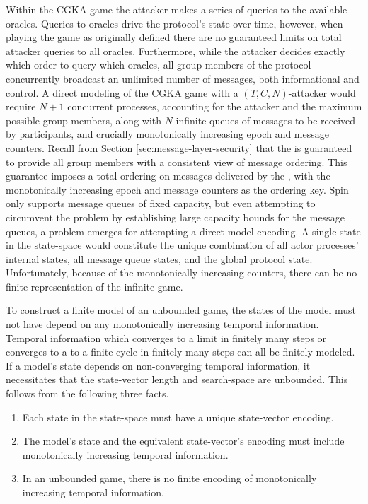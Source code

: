 Within the CGKA game the attacker makes a series of queries to the available oracles.
Queries to oracles drive the  protocol's state over time, however, when playing the game as originally defined there are no guaranteed limits on total attacker queries to all oracles.
Furthermore, while the attacker decides exactly which order to query which oracles, all group members of the  protocol concurrently broadcast an unlimited number of messages, both informational and control.
A direct modeling of the CGKA game with a \((T, C, N)\)-attacker would require \(N+1\) concurrent processes, accounting for the attacker and the maximum possible group members, along with \(N\) infinite queues of messages to be received by participants, and crucially monotonically increasing epoch and message counters.
Recall from Section \ref{sec:message-layer-security} that the  is guaranteed to provide all group members with a consistent view of message ordering.
This guarantee imposes a total ordering on messages delivered by the , with the monotonically increasing epoch and message counters as the ordering key.
Spin only supports message queues of fixed capacity, but even attempting to circumvent the problem by establishing large capacity bounds for the message queues, a problem emerges for attempting a direct model encoding.
A single state in the state-space would constitute the unique combination of all actor processes' internal states, all message queue states, and the global protocol state.
Unfortunately, because of the monotonically increasing counters, there can be no finite representation of the infinite game.

To construct a finite model of an unbounded game, the states of the model must not have depend on any monotonically increasing temporal information.
Temporal information which converges to a limit in finitely many steps or converges to a to a finite cycle in finitely many steps can all be finitely modeled.
If a model's state depends on non-converging temporal information, it necessitates that the state-vector length and search-space are unbounded.
This follows from the following three facts.

\begin{enumerate}
\def\labelenumi{\arabic{enumi}.}
\item Each state in the state-space must have a unique state-vector encoding.
\item The model's state and the equivalent state-vector's encoding must include monotonically increasing temporal information.
\item In an unbounded game, there is no finite encoding of monotonically increasing temporal information.
\end{enumerate}


